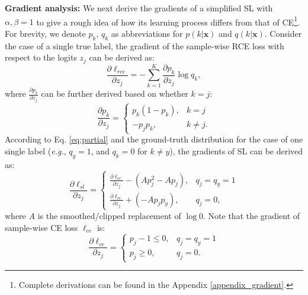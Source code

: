 \documentclass[10pt,twocolumn,letterpaper]{article}
\def \xx {\mathbf{x}}
\begin{document}
\noindent\textbf{Gradient analysis:}
We next derive the gradients of a simplified SL with $\alpha, \beta=1$ to give a rough idea of how its learning process differs from that of CE\footnote{Complete derivations can be found in the Appendix \ref{appendix_gradient}.}. For brevity, we denote $p_k$, $q_k$ as abbreviations for $p(k|\xx)$ and $q(k|\xx)$. Consider the case of a single true label, the gradient of the sample-wise RCE loss with respect to the logits $z_j$ can be derived as:
\begin{equation}
\frac{\partial \ell_{rce}}{\partial z_j}  =
        - \sum_{k=1}^K \frac{\partial p_k}{\partial z_j} \log q_k,
\end{equation}
where $\frac{\partial p_k}{\partial z_j}$ can be further derived based on whether $k=j$:
\begin{equation}\label{eq:partial}
    \frac{\partial p_k}{\partial z_j}  = 
    \begin{cases}
    p_k(1-p_k), & k = j \\
    -p_j p_k, & k \neq j.
    \end{cases}
\end{equation}
According to Eq. \eqref{eq:partial} and the ground-truth distribution for the case of one single label (\textit{e.g.}, $q_y = 1$, and $q_k = 0$ for $k \neq y$), the gradients of SL can be derived as:
\begin{equation}
\frac{\partial \ell_{sl}}{\partial z_j} = 
    \begin{cases}
    \frac{\partial \ell_{ce}}{\partial z_j} - (Ap^{2}_{j} - Ap_j), & q_j = q_y = 1  \\
    \frac{\partial \ell_{ce}}{\partial z_j} + (- Ap_{j}p_{y}), & q_j = 0,
    \end{cases}
\end{equation}
where $A$ is the smoothed/clipped replacement of $\log 0$. Note that the gradient of sample-wise CE loss $\ell_{ce}$ is:
\begin{equation}
    \frac{\partial \ell_{ce}}{\partial z_j} = 
    \begin{cases}
    p_j - 1 \leq 0, & q_j = q_y = 1  \\
    p_j \geq 0, & q_j = 0.
    \end{cases}
\end{equation}
\end{document}
